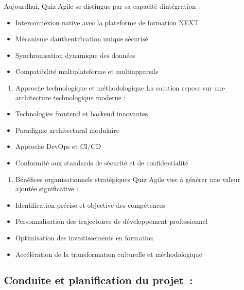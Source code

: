 \documentclass[12pt,a4paper,twoside]{report}
\begin{document}
Aujourd\textquotesingle hui, Quiz Agile se distingue par sa capacité
d\textquotesingle intégration :

\begin{itemize}
\item
  Interconnexion native avec la plateforme de formation NEXT
\item
  Mécanisme d\textquotesingle authentification unique sécurisé
\item
  Synchronisation dynamique des données
\item
  Compatibilité multiplateforme et multiappareils
\end{itemize}

\begin{enumerate}
\def\labelenumi{\arabic{enumi}.}
\setcounter{enumi}{3}
\item
  Approche technologique et méthodologique La solution repose sur une
  architecture technologique moderne :
\end{enumerate}

\begin{itemize}
\item
  Technologies frontend et backend innovantes
\item
  Paradigme architectural modulaire
\item
  Approche DevOps et CI/CD
\item
  Conformité aux standards de sécurité et de confidentialité
\end{itemize}

\begin{enumerate}
\def\labelenumi{\arabic{enumi}.}
\setcounter{enumi}{4}
\item
  Bénéfices organisationnels stratégiques Quiz Agile vise à générer une
  valeur ajoutée significative :
\end{enumerate}

\begin{itemize}
\item
  Identification précise et objective des compétences
\item
  Personnalisation des trajectoires de développement professionnel
\item
  Optimisation des investissements en formation
\item
  Accélération de la transformation culturelle et méthodologique
\end{itemize}

\hypertarget{conduite-et-planification-du-projet}{%
\subsection{Conduite et planification du
projet~:}\label{conduite-et-planification-du-projet}}
\end{document}
